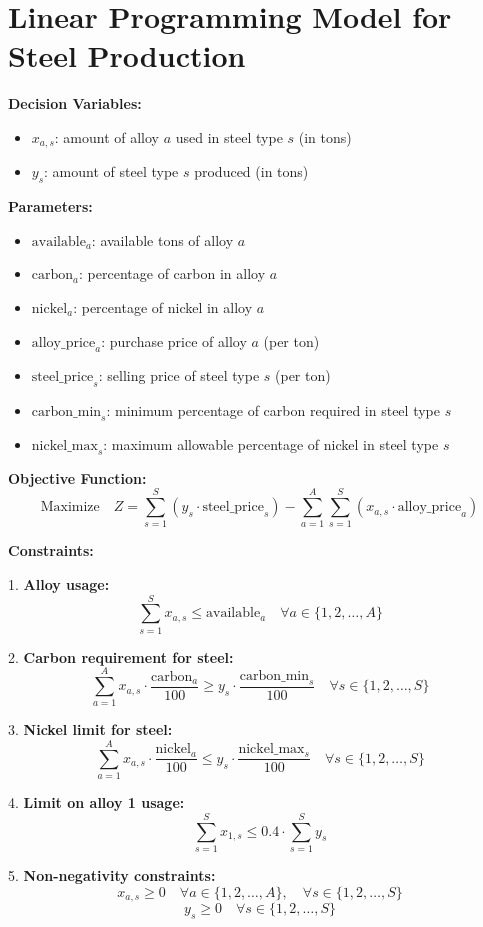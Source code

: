 \documentclass{article}
\begin{document}
\section*{Linear Programming Model for Steel Production}

\textbf{Decision Variables:}
\begin{itemize}
    \item \( x_{a,s} \): amount of alloy \( a \) used in steel type \( s \) (in tons)
    \item \( y_s \): amount of steel type \( s \) produced (in tons)
\end{itemize}

\textbf{Parameters:}
\begin{itemize}
    \item \( \text{available}_{a} \): available tons of alloy \( a \)
    \item \( \text{carbon}_{a} \): percentage of carbon in alloy \( a \)
    \item \( \text{nickel}_{a} \): percentage of nickel in alloy \( a \)
    \item \( \text{alloy\_price}_{a} \): purchase price of alloy \( a \) (per ton)
    \item \( \text{steel\_price}_{s} \): selling price of steel type \( s \) (per ton)
    \item \( \text{carbon\_min}_{s} \): minimum percentage of carbon required in steel type \( s \)
    \item \( \text{nickel\_max}_{s} \): maximum allowable percentage of nickel in steel type \( s \)
\end{itemize}

\textbf{Objective Function:}
\[
\text{Maximize} \quad Z = \sum_{s=1}^{S} (y_s \cdot \text{steel\_price}_{s}) - \sum_{a=1}^{A} \sum_{s=1}^{S} (x_{a,s} \cdot \text{alloy\_price}_{a})
\]

\textbf{Constraints:}

1. \textbf{Alloy usage:}
\[
\sum_{s=1}^{S} x_{a,s} \leq \text{available}_{a} \quad \forall a \in \{1, 2, \ldots, A\}
\]

2. \textbf{Carbon requirement for steel:}
\[
\sum_{a=1}^{A} x_{a,s} \cdot \frac{\text{carbon}_{a}}{100} \geq y_s \cdot \frac{\text{carbon\_min}_{s}}{100} \quad \forall s \in \{1, 2, \ldots, S\}
\]

3. \textbf{Nickel limit for steel:}
\[
\sum_{a=1}^{A} x_{a,s} \cdot \frac{\text{nickel}_{a}}{100} \leq y_s \cdot \frac{\text{nickel\_max}_{s}}{100} \quad \forall s \in \{1, 2, \ldots, S\}
\]

4. \textbf{Limit on alloy 1 usage:}
\[
\sum_{s=1}^{S} x_{1,s} \leq 0.4 \cdot \sum_{s=1}^{S} y_s
\]

5. \textbf{Non-negativity constraints:}
\[
x_{a,s} \geq 0 \quad \forall a \in \{1, 2, \ldots, A\}, \quad \forall s \in \{1, 2, \ldots, S\}
\]
\[
y_s \geq 0 \quad \forall s \in \{1, 2, \ldots, S\}
\]
\end{document}
